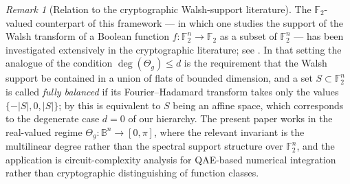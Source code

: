 \documentclass[12pt,a4paper]{article}
\theoremstyle{plain}
\theoremstyle{definition}
\theoremstyle{remark}
\newtheorem{remark}[remark]{Remark}
\begin{document}
\begin{remark}[Relation to the cryptographic Walsh-support literature]
\label{rem:walsh_support_crypto}
The $\mathbb{F}_2$-valued counterpart of this framework — in which one
studies the support of the Walsh transform of a Boolean function
$f:\mathbb{F}_2^n\to\mathbb{F}_2$ as a subset of $\mathbb{F}_2^n$ — has
been investigated extensively in the cryptographic literature;
see \cite{CarletMesnager2004,CarletPastorTornero2025}.
In that setting the analogue of the condition $\deg(\Theta_g)\leq d$ is
the requirement that the Walsh support be contained in a union of flats
of bounded dimension, and a set $S\subset\mathbb{F}_2^n$ is called
\emph{fully balanced} if its Fourier--Hadamard transform takes only the
values $\{-|S|,0,|S|\}$; by \cite[Theorem~1]{CarletPastorTornero2025}
this is equivalent to $S$ being an affine space, which corresponds to
the degenerate case $d=0$ of our hierarchy.
The present paper works in the real-valued regime
$\Theta_g:\mathbb{B}^n\to[0,\pi]$, where the relevant invariant is the
multilinear degree rather than the spectral support structure over
$\mathbb{F}_2^n$, and the application is circuit-complexity analysis for
QAE-based numerical integration rather than cryptographic distinguishing
of function classes.
\end{remark}
\end{document}

